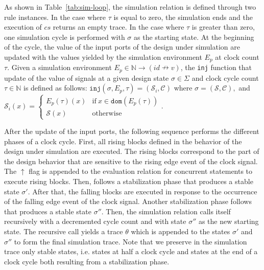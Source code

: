 As shown in Table~\ref{tab:sim-loop}, the \hvhdl{} simulation relation
is defined through two rule instances.  In the case where $\tau$ is
equal to zero, the simulation ends and the execution of $cs$ returns
an empty trace. In the case where $\tau$ is greater than zero, one
simulation cycle is performed with $\sigma$ as the starting state. At
the beginning of the cycle, the value of the input ports of the design
under simulation are updated with the values yielded by the simulation
environment $E_p$ at clock count $\tau$. Given a simulation
environment $E_p\in\mathbb{N}\rightarrow(id\nrightarrow{}v)$, the
\texttt{inj} function that update of the value of signals at a given
design state $\sigma\in\Sigma$ and clock cycle count
$\tau\in{}\mathbb{N}$ is defined as follows:
$\mathtt{inj}(\sigma,E_p,\tau)=(\mathcal{S}_i,\mathcal{C})$ where
$\sigma=(\mathcal{S},\mathcal{C}), $ and $\mathcal{S}_i(x)=
\begin{cases}
  E_p(\tau)(x) & \mathrm{if}~x\in\mathtt{dom}(E_p(\tau)) \\
  \mathcal{S}(x) & \mathrm{otherwise}
\end{cases}$.

After the update of the input ports, the following sequence performs
the different phases of a clock cycle. First, all rising blocks
defined in the behavior of the design under simulation are
executed. The rising blocks correspond to the part of the design
behavior that are sensitive to the rising edge event of the clock
signal. %
The $\uparrow$ flag is appended to the evaluation relation for
concurrent statements to execute rising blocks. Then, follows a
stabilization phase that produces a stable state $\sigma'$. After
that, the falling blocks are executed in response to the occurrence of
the falling edge event of the clock signal. Another stabilization
phase follows that produces a stable state $\sigma''$.  Then, the
\hvhdl{} simulation relation calls itself recursively with a
decremented cycle count and with state $\sigma''$ as the new starting
state. The recursive call yields a trace $\theta$ which is appended to
the states $\sigma'$ and $\sigma''$ to form the final simulation
trace. Note that we preserve in the simulation trace only stable
states, i.e. states at half a clock cycle and states at the end of a
clock cycle both resulting from a stabilization phase.

